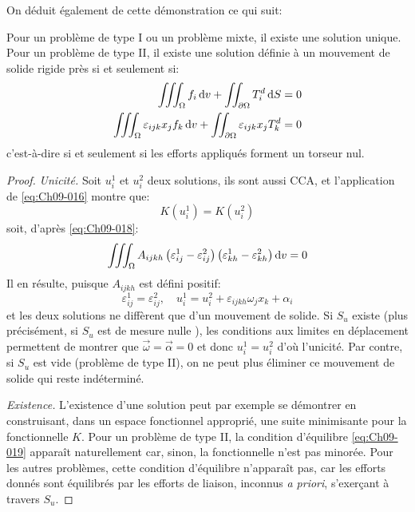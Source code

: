 On déduit également de cette démonstration ce qui suit: 
\begin{thm}
    Pour un problème de type I ou un problème mixte, il existe une solution unique.
    Pour un problème de type II, il existe une solution définie à un mouvement de solide rigide près si et seulement si:
    \begin{equation}
        \begin{split}
            \iiint_{\Omega} f_i \mathop{\mathrm{{}d}}\mathopen{} v + \iint_{\partial \Omega} T_i^d \mathop{\mathrm{{}d}}\mathopen{} S = 0 \\
            \iiint_{\Omega} \varepsilon_{ijk} x_{j} f_k \mathop{\mathrm{{}d}}\mathopen{} v + \iint_{\partial \Omega} \varepsilon_{ijk} x_j T_k^d = 0
        \end{split}
        \label{eq:Ch09-019}
    \end{equation}
    c'est-à-dire si et seulement si les efforts appliqués forment un torseur nul. 
\end{thm}
\begin{proof}
    \textit{Unicité.}
    Soit $u_i^1$ et $u_i^2$ deux solutions, ils sont aussi CCA, et l'application de \eqref{eq:Ch09-016} montre que: 
    \begin{displaymath}
        K\left( u_i^1 \right) = K \left( u_i^2 \right)
    \end{displaymath}
    soit, d'après \eqref{eq:Ch09-018}:
    \begin{eqnarray}
        \iiint_{\Omega} A_{ijkh} \left( \varepsilon_{ij}^1 - \varepsilon_{ij}^2 \right) \left( \varepsilon_{kh}^1 - \varepsilon_{kh}^2 \right) \mathop{\mathrm{{}d}}\mathopen{} v = 0
        \label{eq:Ch09-020}
    \end{eqnarray}
    Il en résulte, puisque $A_{ijkh}$ est défini positif:
    \begin{equation}
        \varepsilon_{ij}^1 = \varepsilon_{ij}^2,\quad u_i^1 = u_i^2 + \varepsilon_{ijkh} \omega_j x_k + \alpha_i
        \label{eq:Ch09-021}
    \end{equation}
    et les deux solutions ne diffèrent que d'un mouvement de solide.
    Si $S_u$ existe (plus précisément, si $S_u$ est de mesure nulle ), les conditions aux limites en déplacement permettent de montrer que $\vec{\omega} = \vec{\alpha} = 0$ 
et donc $u_i^1 = u_i^2$ d'où l'unicité. 
    Par contre, si $S_u$ est vide (problème de type II), on ne peut plus éliminer ce mouvement de solide qui reste indéterminé.

    \textit{Existence.}
    L'existence d'une solution peut par exemple se démontrer en construisant, dans un espace fonctionnel approprié, une suite minimisante pour la fonctionnelle $K$.
    Pour un problème de type II, la condition d'équilibre \eqref{eq:Ch09-019} apparaît naturellement car, sinon, la fonctionnelle n'est pas minorée. 
    Pour les autres problèmes, cette condition d'équilibre n'apparaît pas, car les efforts donnés sont équilibrés par les efforts de liaison, inconnus \textit{a priori}, s'exerçant à travers $S_u$.
\end{proof}
